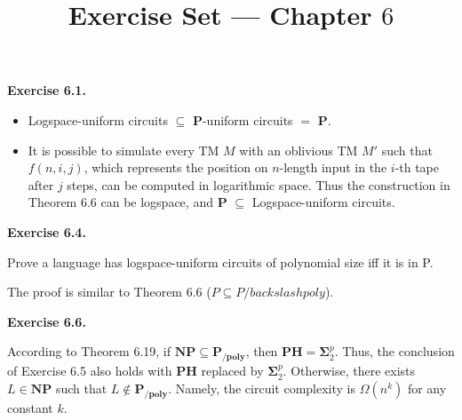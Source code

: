 \documentclass[a4paper]{article}
\title{Exercise Set --- Chapter $6$}
\date{}
\newenvironment{exercise}[1]{
	\par
	\noindent\textbf{Exercise #1.}\quad
}{
	\par
	\bigskip
}
\begin{document}
\maketitle

\begin{exercise}{6.1}
    \begin{itemize}
    \item Logspace-uniform circuits $\subseteq$ $\mathbf{P}$-uniform circuits $=$ $\mathbf{P}$.
    \item It is possible to simulate every TM $M$ with an oblivious TM $M'$ such that $f(n,i,j)$, which represents the position
        on $n$-length input in the $i$-th tape after $j$ steps, can be computed in logarithmic space.
            Thus the construction in Theorem 6.6 can be logspace, and $\mathbf{P}$ $\subseteq$ Logspace-uniform circuits.
    \end{itemize}
\end{exercise}

\begin{exercise}{6.4}
Prove a language has logspace-uniform circuits of polynomial size iff it is in P.

The proof is similar to Theorem 6.6 ($P \subseteq P/backslash poly$).



\end{exercise}


\begin{exercise}{6.6}
    According to Theorem 6.19, if $\textbf{NP} \subseteq \textbf{P}_{\textbf{/poly}}$, then $\textbf{PH} = \mathbf{\Sigma}_2^p$. Thus, the conclusion of Exercise 6.5 also holds with $\mathbf{PH}$ replaced by $\mathbf{\Sigma}_2^p$. Otherwise, there exists $L \in \textbf{NP}$ such that $L \not\in \textbf{P}_{\textbf{/poly}}$. Namely, the circuit complexity is $\Omega(n^k)$ for any constant $k$.
\end{exercise}
\end{document}
